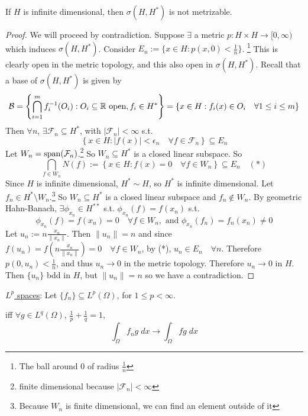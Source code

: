 \begin{thm}
    If $H$ is infinite dimensional, then $\sigma(H, H^*)$ is not metrizable. 
\end{thm}

\begin{proof}
    We will proceed by contradiction. Suppose $\exists$ a metric $p : H \times H \to [0, \infty)$
    which induces $\sigma(H, H^*)$. Consider $E_n := \{x \in H : p(x, 0) < \frac{1}{n} \}$.
    \footnote{The ball around $0$ of radius $\frac{1}{n}$}
    This is clearly open in the metric topology, and this also open in $\sigma(H, H^*)$.
    Recall that a base of $\sigma(H, H^*)$ is given by 
    \[
        \mathcal{B} = \left\{ \bigcap_{i = 1}^m f_i^{-1}(O_i) : O_i \subseteq \mathbb{R}  \text{ open}, 
        f_i \in H^* \right\} = \left\{ x \in H : f_i(x) \in O_i \quad \forall 1 \leq i \leq 
        m\right\} 
    \]   
    Then $\forall n$, $\exists \mathcal{F}_n \subseteq H^*$, with $|\mathcal{F}_n| < \infty$
    s.t.
    \[
        \left\{ x \in H  : |f(x)| < \epsilon_n \quad \forall f \in \mathcal{F}_n\right\} \subseteq E_n
    \]     
    Let $W_n = \operatorname{span}(\mathcal{F}_n)$.\footnote{finite dimensional because $|\mathcal{F}_n| < \infty$ }
    So $W_n \subseteq H^*$ is a closed linear subspace. 
    So
    \[
        \bigcap_{f \in W_n} N(f) := \left\{ x \in H : f(x) = 0 \quad \forall f \in W_n \right\} \subseteq E_n \quad (*)
    \]   
    Since $H$ is infinite dimensional, $H^* \sim H$, so $H^*$ is infinite dimensional.
    Let $f_n \in H^* \setminus W_n$.\footnote{Because $W_n$ is finite dimensional, we can find an element outside of it}
    So $W_n \subseteq H^*$ is a closed linear subspace and $f_n \notin W_n$. By geometric
    Hahn-Banach, $\exists \phi_{x_n} \in H^{**}$ s.t. $\phi_{x_n}(f) = f(x_n)$ s.t.
    \[
        \phi_{x_n}(f) = f(x_n) = 0 \quad \forall f \in W_n, \text{ and } \phi_{x_n}(f_n) = f_n(x_n) \neq 0
    \]     
    Let $u_n := n \frac{x_n}{\| x_n \| }$. Then $\| u_n \| = n$ and since
    $f(u_n) = f(n \frac{x_n}{\| x_n \| }) = 0 \quad \forall f \in W_n$, by (*), 
    $u_n \in E_n \quad \forall n$. Therefore $p(0, u_n) < \frac{1}{n}$, and thus
    $u_n \to 0$ in the metric topology. Therefore $u_n \to 0$ in $H$. Then
    $\{u_n\}$ bdd in $H$, but $\| u_n \| = n $ so we have a contradiction. \qedhere      
\end{proof}

\underline{$L^p$ spaces}:
Let $\{f_n \} \subseteq L^p(\Omega)$, for $1 \leq p < \infty$.  

\begin{defn}
     iff $\forall g \in L^q(\Omega)$, $\frac{1}{p} + \frac{1}{q} = 1$,
    \[
        \int_{\Omega} f_n g \; dx \to \int_{\Omega} f g \; dx
    \]      
\end{defn}

